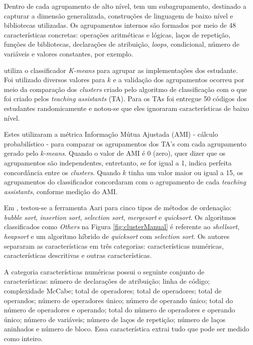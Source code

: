     Dentro de cada agrupamento de alto nível, tem um subagrupamento, destinado a
    capturar a dimensão generalizada, construções de linguagem de baixo nível e
    bibliotecas utilizadas. Os agrupamentos internos são formados por meio de 48
    características concretas: operações aritméticas e lógicas, laços de repetição,
    funções de bibliotecas, declarações de atribuição, \textit{loops}, condicional,
    número de variáveis e valores constantes, por exemplo.
    
     utiliza o classificador \textit{K-means} para agrupar
    as implementações dos estudante. Foi utilizado diversos valores para $k$
    e a validação dos agrupamentos ocorreu por meio da comparação dos \textit{clusters}
    criado pelo algoritmo de classificação com o que foi criado pelos
    \textit{teaching assistants} (TA). Para os TAs foi entregue 50 códigos
    dos estudantes randomicamente e notou-se que eles ignoraram características
    de baixo nível.
    
    Estes utilizaram a métrica Informação Mútua Ajustada (AMI) - cálculo
    probabilístico - para comparar os agrupamentos dos TA's com cada agrupamento
    gerado pelo \textit{k-means}. Quando o valor de AMI é 0 (zero), quer dizer
    que os agrupamentos são independentes, entretanto, se for igual a 1, indica
    perfeita concordância entre os \textit{clusters}. Quando $k$ tinha um
    valor maior ou igual a 15, os agrupamentos do classificador concordaram com
    o agrupamento de cada \textit{teaching assistants}, conforme medição do AMI.
    
    Em , testou-se a ferramenta Aari para cinco tipos
    de métodos de ordenação: \textit{bubble sort}, \textit{insertion sort},
    \textit{selection sort}, \textit{mergesort} e \textit{quicksort}. Os
    algoritmos classificados como \textit{Others} na Figura \ref{fig:clusterManual}
    é referente ao \textit{shellsort}, \textit{heapsort} e um algoritmo híbrido de
    \textit{quicksort} com \textit{selection sort}. Os autores separaram as
    características em três categorias: características numéricas, características
    descritivas e outras características.
    
    A categoria características numéricas possui o seguinte conjunto de características:
    número de declarações de atribuição; linha de código; complexidade McCabe; total de
    operadores; total de operadores; total de operandos; número de operadores único;
    número de operando único; total do número de operadores e operando; total do
    número de operadores e operando único; número de variáveis; número de laços de
    repetição; número de laços aninhados e número de bloco. Essa característica
    extrai tudo que pode ser medido como inteiro.
    
